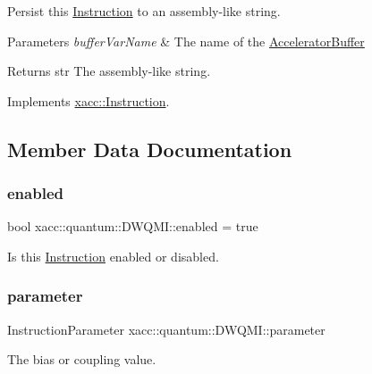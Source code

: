 Persist this \hyperlink{a01657}{Instruction} to an assembly-\/like string.


\begin{DoxyParams}{Parameters}
{\em buffer\+Var\+Name} & The name of the \hyperlink{a01625}{Accelerator\+Buffer} \\
\hline
\end{DoxyParams}
\begin{DoxyReturn}{Returns}
str The assembly-\/like string. 
\end{DoxyReturn}


Implements \hyperlink{a01657_ae94c2d089908294c1d410b14c96817ae}{xacc\+::\+Instruction}.



\subsection{Member Data Documentation}
\mbox{\label{a01225_ae06f0e1952dea7381cbae3cd3954de1f}} 
\subsubsection{\texorpdfstring{enabled}{enabled}}
{\footnotesize\ttfamily bool xacc\+::quantum\+::\+D\+W\+Q\+M\+I\+::enabled = true\hspace{0.3cm}{\ttfamily [protected]}}

Is this \hyperlink{a01657}{Instruction} enabled or disabled. \mbox{\label{a01225_a30249f83412fb56f7c8be9ec0ad726a9}} 
\subsubsection{\texorpdfstring{parameter}{parameter}}
{\footnotesize\ttfamily Instruction\+Parameter xacc\+::quantum\+::\+D\+W\+Q\+M\+I\+::parameter\hspace{0.3cm}{\ttfamily [protected]}}

The bias or coupling value. \mbox{\label{a01225_a5fc6e587225f365b150ef58fc7d2ed32}} 
